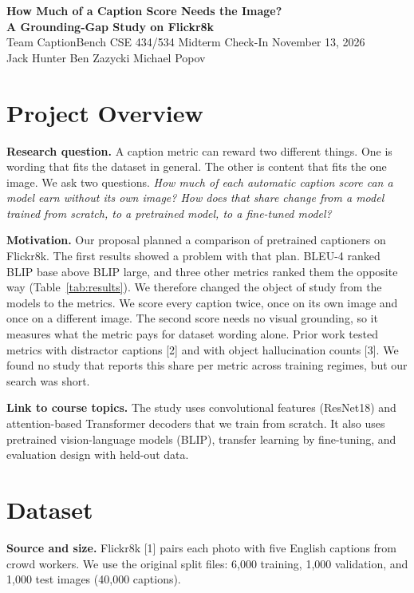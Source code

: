 \documentclass[11pt]{article}
\newcommand{\teamname}{Team CaptionBench}
\newcommand{\roles}{Jack Hunter \textbullet{} Ben Zazycki \textbullet{} Michael Popov}
\begin{document}
\pagestyle{plain}

\begin{center}
{\Large\bfseries How Much of a Caption Score Needs the Image?\\[1pt] A Grounding-Gap Study on Flickr8k}\\[4pt]
{\normalsize \teamname{} \textbullet{} CSE 434/534 Midterm Check-In \textbullet{} November 13, 2026}\\[1pt]
{\small \roles}
\end{center}
\vspace{-8pt}

\section{Project Overview}

\textbf{Research question.} A caption metric can reward two different things.
One is wording that fits the dataset in general. The other is content that fits
the one image. We ask two questions. \emph{How much of each automatic caption score can a model
earn without its own image? How does that share change from a model trained
from scratch, to a pretrained model, to a fine-tuned model?}

\textbf{Motivation.} Our proposal planned a comparison of pretrained captioners
on Flickr8k. The first results showed a problem with that plan. BLEU-4 ranked
BLIP base above BLIP large, and three other metrics ranked them the opposite way
(Table~\ref{tab:results}). We therefore changed the object of study from the models to the metrics. We
score every caption twice, once on its own image and once on a different image.
The second score needs no visual grounding, so it measures what the metric pays
for dataset wording alone. Prior work tested metrics with distractor captions
[2] and with object hallucination counts [3].
We found no study that reports this share per metric across training regimes,
but our search was short.

\textbf{Link to course topics.} The study uses convolutional features
(ResNet18) and attention-based Transformer decoders that we train from scratch.
It also uses pretrained vision-language models (BLIP), transfer learning by
fine-tuning, and evaluation design with held-out data.

\section{Dataset}

\textbf{Source and size.} Flickr8k [1] pairs each photo with five
English captions from crowd workers. We use the original split files: 6,000
training, 1,000 validation, and 1,000 test images (40,000 captions).
\end{document}
